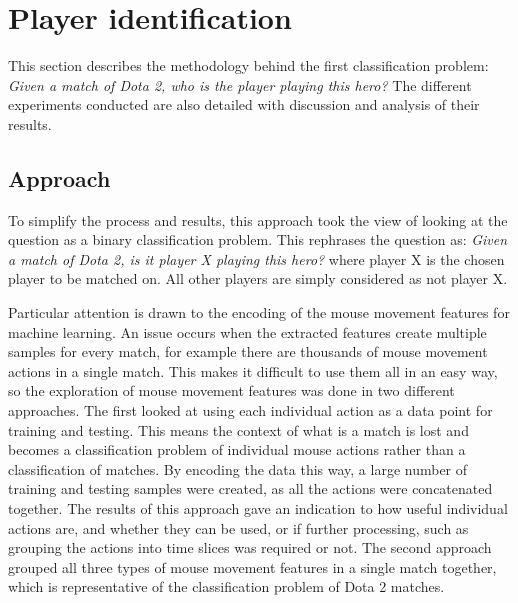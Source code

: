 \documentclass[Report.tex]{subfiles}
\begin{document}
\section{Player identification}\label{sec:game-classification}
This section describes the methodology behind the first classification problem: \textit{Given a match of Dota 2, who is the player playing this hero?} The different experiments conducted are also detailed with discussion and analysis of their results. 



\subsection{Approach}\label{sec:game-approach}
To simplify the process and results, this approach took the view of looking at the question as a binary classification problem. This rephrases the question as: \textit{Given a match of Dota 2, is it player X playing this hero?} where player X is the chosen player to be matched on. All other players are simply considered as not player X. 

Particular attention is drawn to the encoding of the mouse movement features for machine learning. An issue occurs when the extracted features create multiple samples for every match, for example there are thousands of mouse movement actions in a single match. This makes it difficult to use them all in an easy way, so the exploration of mouse movement features was done in two different approaches. The first looked at using each individual action as a data point for training and testing. This means the context of what is a match is lost and becomes a classification problem of individual mouse actions rather than a classification of matches. By encoding the data this way, a large number of training and testing samples were created, as all the actions were concatenated together. The results of this approach gave an indication to how useful individual actions are, and whether they can be used, or if further processing, such as grouping the actions into time slices was required or not. The second approach grouped all three types of mouse movement features in a single match together, which is representative of the classification problem of Dota 2 matches. 

\end{document}

